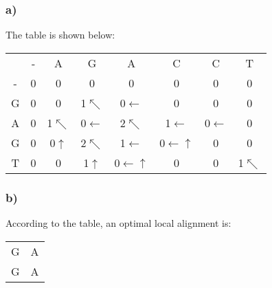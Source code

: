 \documentclass{article}
\begin{document}
\subsubsection{a)}	
The table is shown below:\\
\begin{center}
\begin{tabular}{c|c|c|c|c|c|c|c|}
\multicolumn{1}{c}{ } & \multicolumn{1}{c}{-} & \multicolumn{1}{c}{A} & \multicolumn{1}{c}{G} & \multicolumn{1}{c}{A} & \multicolumn{1}{c}{C} & \multicolumn{1}{c}{C} & \multicolumn{1}{c}{T} \\
\cline{2-8}
- & 0 & \cellcolor{red!50}0 & 0 & 0 & 0 & 0 & 0 \\
\cline{2-8}
G & \cellcolor{red!50}0 & 0 & \cellcolor{red!50}1$\nwarrow$ & 0$\leftarrow$ & 0 & 0 & 0 \\
\cline{2-2}
A & 0 & \cellcolor{red!50}1$\nwarrow$ & 0$\leftarrow$ & \cellcolor{red!50}2$\nwarrow$ & 1$\leftarrow$ & 0$\leftarrow$ & 0 \\
\cline{2-2}
G & 0 & 0$\uparrow$ & \cellcolor{red!50}2$\nwarrow$ & 1$\leftarrow$ & 0$\leftarrow\uparrow$ & 0 & 0 \\
\cline{2-2}
T & 0 & 0 & 1$\uparrow$ & 0$\leftarrow\uparrow$ & 0 & 0 & 1$\nwarrow$ \\
\cline{2-8}
\end{tabular}
\end{center}

\subsubsection{b)}
According to the table, an optimal local alignment is:\\
\begin{center}
\begin{tabular}{cc}
G & A \\
G & A
\end{tabular}
\end{center}
\end{document}
